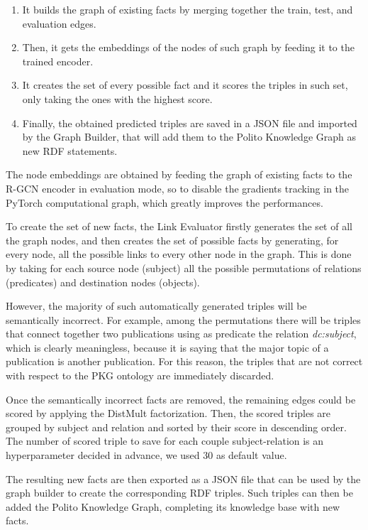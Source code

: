 \documentclass[%
    corpo=13.5pt,
    twoside,
    oldstyle,
    tipotesi=magistrale,
    greek,
    evenboxes
]{toptesi}
\begin{document}
\begin{enumerate}
    \item It builds the graph of existing facts by merging together the train,
        test, and evaluation edges.
    \item Then, it gets the embeddings of the nodes of such graph by feeding it
        to the trained encoder.
    \item It creates the set of every possible fact and it scores the triples in
        such set, only taking the ones with the highest score.
    \item Finally, the obtained predicted triples are saved in a JSON file
        and imported by the Graph Builder, that will add them to the Polito
        Knowledge Graph as new RDF statements.
\end{enumerate}

The node embeddings are obtained by feeding the graph of existing
facts to the R-GCN encoder in evaluation mode, so to disable the gradients
tracking in the PyTorch computational graph, which greatly improves the
performances.

To create the set of new facts, the Link Evaluator firstly
generates the set of all the graph nodes, and then creates the set of
possible facts by generating, for every node, all the possible links to
every other node in the graph. This is done by taking for each source node
(subject) all the possible permutations of relations (predicates) and
destination nodes (objects).

However, the majority of such automatically generated triples will be semantically
incorrect. For example, among the permutations there will be triples that
connect together two publications using as predicate the relation
\emph{dc:subject}, which is clearly meaningless, because it is saying that the
major topic of a publication is another publication.
For this reason, the triples that are not correct with respect to the PKG
ontology are immediately discarded.

Once the semantically incorrect facts are removed, the remaining edges could be
scored by applying the DistMult factorization.
Then, the scored triples are grouped by subject and relation and sorted by their
score in descending order.
The number of scored triple to save for each couple subject-relation is an
hyperparameter decided in advance, we used 30 as default value.

The resulting new facts are then exported as a JSON file that can be used by
the graph builder to create the corresponding RDF triples.
Such triples can then be added the Polito Knowledge Graph, completing its
knowledge base with new facts.
\end{document}
